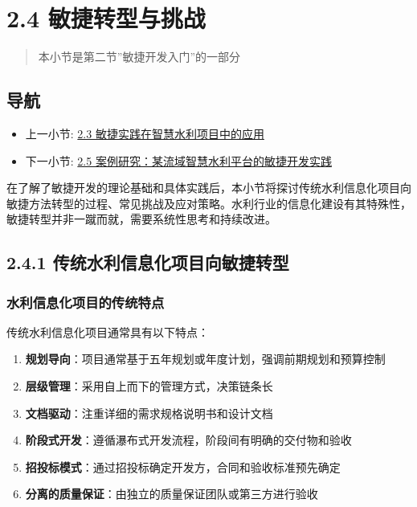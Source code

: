 \section{2.4
敏捷转型与挑战}\label{ux654fux6377ux8f6cux578bux4e0eux6311ux6218}

\begin{quote}
本小节是第二节''敏捷开发入门''的一部分
\end{quote}

\subsection{导航}\label{ux5bfcux822a}

\begin{itemize}
\tightlist
\item
  上一小节: \href{section03-02-03.md}{2.3
  敏捷实践在智慧水利项目中的应用}
\item
  下一小节: \href{section03-02-05.md}{2.5
  案例研究：某流域智慧水利平台的敏捷开发实践}
\end{itemize}

在了解了敏捷开发的理论基础和具体实践后，本小节将探讨传统水利信息化项目向敏捷方法转型的过程、常见挑战及应对策略。水利行业的信息化建设有其特殊性，敏捷转型并非一蹴而就，需要系统性思考和持续改进。

\subsection{2.4.1
传统水利信息化项目向敏捷转型}\label{ux4f20ux7edfux6c34ux5229ux4fe1ux606fux5316ux9879ux76eeux5411ux654fux6377ux8f6cux578b}

\subsubsection{水利信息化项目的传统特点}\label{ux6c34ux5229ux4fe1ux606fux5316ux9879ux76eeux7684ux4f20ux7edfux7279ux70b9}

传统水利信息化项目通常具有以下特点：

\begin{enumerate}
\def\labelenumi{\arabic{enumi}.}
\tightlist
\item
  \textbf{规划导向}：项目通常基于五年规划或年度计划，强调前期规划和预算控制
\item
  \textbf{层级管理}：采用自上而下的管理方式，决策链条长
\item
  \textbf{文档驱动}：注重详细的需求规格说明书和设计文档
\item
  \textbf{阶段式开发}：遵循瀑布式开发流程，阶段间有明确的交付物和验收
\item
  \textbf{招投标模式}：通过招投标确定开发方，合同和验收标准预先确定
\item
  \textbf{分离的质量保证}：由独立的质量保证团队或第三方进行验收
\end{enumerate}

